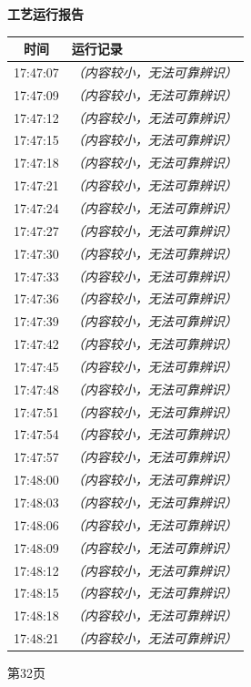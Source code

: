 \documentclass[UTF8,10pt,a4paper,fontset=fandol]{ctexart}
\begin{document}
\hfill
\begin{minipage}[t]{0.47\textwidth}
\centering
\textbf{工艺运行报告}

\vspace{2pt}
\begin{tabularx}{\linewidth}{|c|X|}
\hline
\textbf{时间} & \textbf{运行记录}\\ \hline
17:47:07 & \textit{（内容较小，无法可靠辨识）}\\ \hline
17:47:09 & \textit{（内容较小，无法可靠辨识）}\\ \hline
17:47:12 & \textit{（内容较小，无法可靠辨识）}\\ \hline
17:47:15 & \textit{（内容较小，无法可靠辨识）}\\ \hline
17:47:18 & \textit{（内容较小，无法可靠辨识）}\\ \hline
17:47:21 & \textit{（内容较小，无法可靠辨识）}\\ \hline
17:47:24 & \textit{（内容较小，无法可靠辨识）}\\ \hline
17:47:27 & \textit{（内容较小，无法可靠辨识）}\\ \hline
17:47:30 & \textit{（内容较小，无法可靠辨识）}\\ \hline
17:47:33 & \textit{（内容较小，无法可靠辨识）}\\ \hline
17:47:36 & \textit{（内容较小，无法可靠辨识）}\\ \hline
17:47:39 & \textit{（内容较小，无法可靠辨识）}\\ \hline
17:47:42 & \textit{（内容较小，无法可靠辨识）}\\ \hline
17:47:45 & \textit{（内容较小，无法可靠辨识）}\\ \hline
17:47:48 & \textit{（内容较小，无法可靠辨识）}\\ \hline
17:47:51 & \textit{（内容较小，无法可靠辨识）}\\ \hline
17:47:54 & \textit{（内容较小，无法可靠辨识）}\\ \hline
17:47:57 & \textit{（内容较小，无法可靠辨识）}\\ \hline
17:48:00 & \textit{（内容较小，无法可靠辨识）}\\ \hline
17:48:03 & \textit{（内容较小，无法可靠辨识）}\\ \hline
17:48:06 & \textit{（内容较小，无法可靠辨识）}\\ \hline
17:48:09 & \textit{（内容较小，无法可靠辨识）}\\ \hline
17:48:12 & \textit{（内容较小，无法可靠辨识）}\\ \hline
17:48:15 & \textit{（内容较小，无法可靠辨识）}\\ \hline
17:48:18 & \textit{（内容较小，无法可靠辨识）}\\ \hline
17:48:21 & \textit{（内容较小，无法可靠辨识）}\\ \hline
\end{tabularx}

\vspace{4pt}
{\scriptsize 第32页}
\end{minipage}
\end{document}
